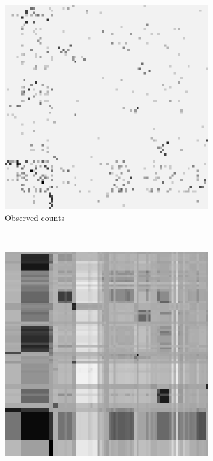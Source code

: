 \begin{figure}[t]
\centering
\begin{subfigure}[b]{0.22\textwidth}
\centering
\includegraphics[scale=.25]{../figs/eckmann-small/parmat/observed}
\caption{Observed counts}
\end{subfigure}
~
\begin{subfigure}[b]{0.22\textwidth}
\centering
\includegraphics[scale=.25]{../figs/eckmann-small/parmat/1}

\end{subfigure}
\end{figure}
